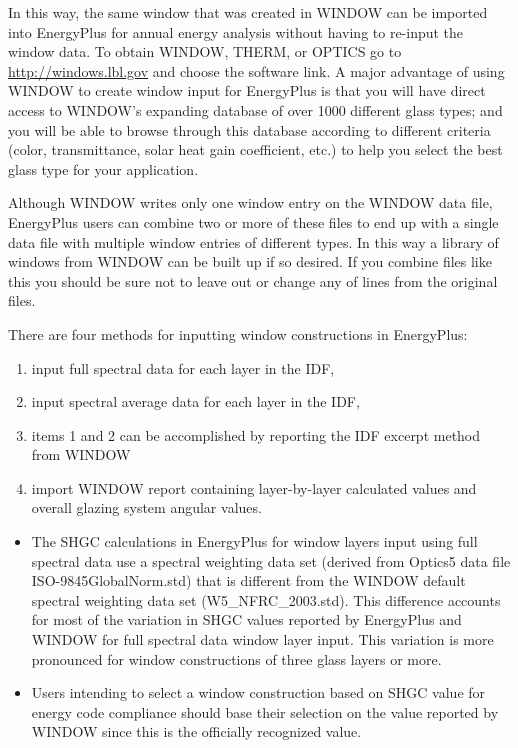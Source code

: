 In this way, the same window that was created in WINDOW can be imported into EnergyPlus for annual energy analysis without having to re-input the window data. To obtain WINDOW, THERM, or OPTICS go to \url{http://windows.lbl.gov} and choose the software link. A major advantage of using WINDOW to create window input for EnergyPlus is that you will have direct access to WINDOW's expanding database of over 1000 different glass types; and you will be able to browse through this database according to different criteria (color, transmittance, solar heat gain coefficient, etc.) to help you select the best glass type for your application.

Although WINDOW writes only one window entry on the WINDOW data file, EnergyPlus users can combine two or more of these files to end up with a single data file with multiple window entries of different types. In this way a library of windows from WINDOW can be built up if so desired. If you combine files like this you should be sure not to leave out or change any of lines from the original files.

There are four methods for inputting window constructions in EnergyPlus:

\begin{enumerate}
\tightlist
\item
  input full spectral data for each layer in the IDF,
\item
  input spectral average data for each layer in the IDF,
\item
  items 1 and 2 can be accomplished by reporting the IDF excerpt method from WINDOW
\item
  import WINDOW report containing layer-by-layer calculated values and overall glazing system angular values.
\end{enumerate}

\begin{callout}
\end{callout}

\begin{itemize}
\item
  The SHGC calculations in EnergyPlus for window layers input using full spectral data use a spectral weighting data set (derived from Optics5 data file ISO-9845GlobalNorm.std) that is different from the WINDOW default spectral weighting data set (W5\_NFRC\_2003.std). This difference accounts for most of the variation in SHGC values reported by EnergyPlus and WINDOW for full spectral data window layer input. This variation is more pronounced for window constructions of three glass layers or more.
\item
  Users intending to select a window construction based on SHGC value for energy code compliance should base their selection on the value reported by WINDOW since this is the officially recognized value.
\end{itemize}

